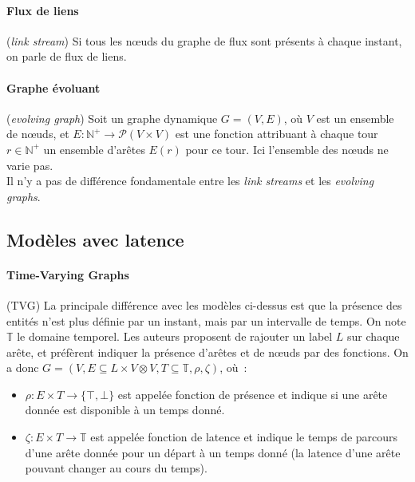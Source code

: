 \documentclass[12pt,a4paper]{article}
\begin{document}
\paragraph{Flux de liens}\cite{latapy2017stream} (\textit{link
stream}) Si tous les nœuds du graphe de flux sont présents à chaque
instant, on parle de flux de liens.

\paragraph{Graphe évoluant}\cite{kuhn2011dynamic} (\textit{evolving
  graph}) Soit un graphe dynamique \(G = (V, E)\), où \(V\) est un
ensemble de nœuds, et
\(E : \mathbb{N}^{+} \to \mathcal{P}(V \times V)\) est une fonction
attribuant à chaque tour \(r \in \mathbb{N}^{+}\) un ensemble d'arêtes
\(E(r)\) pour ce tour. Ici l'ensemble des nœuds ne varie pas.\\


Il n'y a pas de différence fondamentale entre les \textit{link
  streams} et les \textit{evolving graphs}.

\subsection{Modèles avec latence}

\paragraph{Time-Varying Graphs}\cite{casteigts2012time} (TVG) La
principale différence avec les modèles ci-dessus est que la présence
des entités n'est plus définie par un instant, mais par un intervalle
de temps. On note \(\mathbb{T}\) le domaine temporel. Les auteurs
proposent de rajouter un label \(L\) sur chaque arête, et préfèrent
indiquer la présence d'arêtes et de nœuds par des fonctions. On a donc
\(G = (V, E \subseteq L \times V \otimes V, T \subseteq \mathbb{T},
\rho, \zeta)\), où~:
\begin{itemize}
\item \(\rho : E \times T \to \{\top, \bot\}\) est appelée fonction
  de présence et indique si une arête donnée est disponible à un temps
  donné.
\item \(\zeta : E \times T \to \mathbb{T}\) est appelée fonction de
  latence et indique le temps de parcours d'une arête donnée pour un
  départ à un temps donné (la latence d'une arête pouvant changer au
  cours du temps).
\end{itemize}
\end{document}
